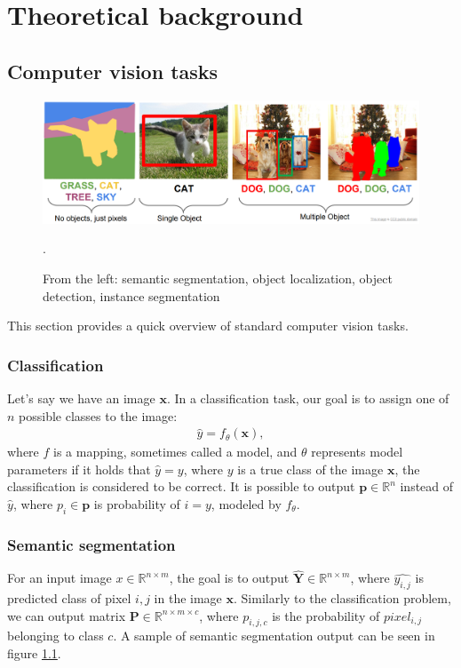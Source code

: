 \chapter{Theoretical background}
\label{chapter:theoretical_bg}
\section{Computer vision tasks}
\begin{figure}
    \centering
    \includegraphics[width=\linewidth]{images/computer_vision_tasks.png}
    \caption{From the left: semantic segmentation, object localization, object detection, instance segmentation}.
    \label{fig:computer_vision_tasks}
\end{figure}
This section provides a quick overview of standard computer vision tasks.
\subsection{Classification}
Let's say we have an image $\mathbf{x}$. In a classification task, our goal is to assign one of $n$ possible classes to the image:
\begin{align}
    \hat{y} = f_\theta\left(\mathbf{x} \right),
\end{align}
where $f$ is a mapping, sometimes called a model, and $\theta$  represents model parameters if it holds that $\hat{y}=y$, where $y$ is a true class of the image $\mathbf{x}$, the classification is considered to be correct.
It is possible to output $\mathbf{p} \in \mathbb{R}^n$ instead of $\hat{y}$, where $p_i \in \mathbf{p}$ is probability of $i = y$, modeled by $f_\theta$.

\subsection{Semantic segmentation}
For an input image $x \in \mathbb{R}^{n \times m}$, the goal is to output $\mathbf{\hat{Y}} \in \mathbb{R}^{n \times m}$, where $\hat{y_{i,j}}$ is predicted class of pixel $i,j$ in the image $\mathbf{x}$. Similarly to the classification problem, we can output matrix $\mathbf{P} \in \mathbb{R}^{n \times m \times c}$, where $p_{i,j,c}$ is the probability of $pixel_{i,j}$ belonging to class $c$. A sample of semantic segmentation output can be seen in figure \ref{fig:computer_vision_tasks}.

